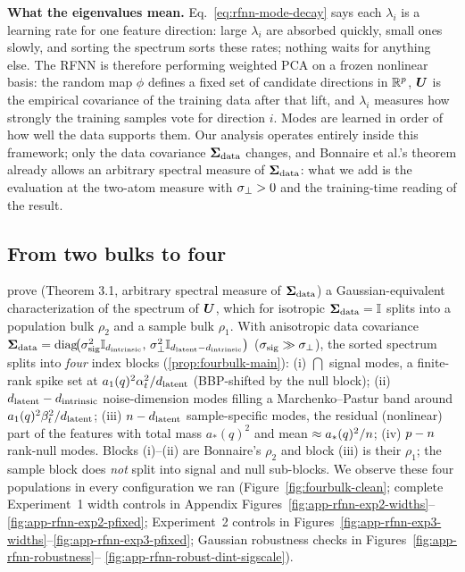 \textbf{What the eigenvalues mean.}
Eq.~\eqref{eq:rfnn-mode-decay} says each $\lambda_i$ is a learning rate for one feature direction: large $\lambda_i$ are absorbed quickly, small ones slowly, and sorting the spectrum sorts these rates; nothing waits for anything else. The RFNN is therefore performing weighted PCA on a frozen nonlinear basis: the random map $\phi$ defines a fixed set of candidate directions in $\mathbb{R}^{p}$, $\bm{U}$ is the empirical covariance of the training data after that lift, and $\lambda_i$ measures how strongly the training samples vote for direction $i$. Modes are learned in order of how well the data supports them. Our analysis operates entirely inside this framework; only the data covariance $\bm{\Sigma}_{\mathrm{data}}$ changes, and Bonnaire et al.'s theorem already allows an arbitrary spectral measure of $\bm{\Sigma}_{\mathrm{data}}$: what we add is the evaluation at the two-atom measure with $\sigma_{\perp}>0$ and the training-time reading of the result.

\subsection{From two bulks to four}
\label{sec:rfnn-fourbulks}

\citeauthor{bonnaire2025} prove (Theorem 3.1, arbitrary spectral measure of $\bm{\Sigma}_{\mathrm{data}}$) a Gaussian-equivalent characterization of the spectrum of $\bm{U}$, which for isotropic $\bm{\Sigma}_{\mathrm{data}}=\mathbb I$ splits into a population bulk $\rho_2$ and a sample bulk $\rho_1$. With anisotropic data covariance $\bm{\Sigma}_{\mathrm{data}} = \operatorname{diag}\!\bigl(\sigma_{\mathrm{sig}}^2 \mathbb{I}_{d_{\mathrm{intrinsic}}},\, \sigma_{\perp}^2 \mathbb{I}_{d_{\mathrm{latent}} - d_{\mathrm{intrinsic}}}\bigr)$ ($\sigma_{\mathrm{sig}} \gg \sigma_{\perp}$), the sorted spectrum splits into \emph{four} index blocks (\cref{prop:fourbulk-main}): (i) $\dint$ signal modes, a finite-rank spike set at $a_1(q)^2\alpha_t^2/d_{\mathrm{latent}}$ (BBP-shifted by the null block); (ii) $d_{\mathrm{latent}}-d_{\mathrm{intrinsic}}$ noise-dimension modes filling a Marchenko--Pastur band around $a_1(q)^2\beta_t^2/d_{\mathrm{latent}}$; (iii) $n-d_{\mathrm{latent}}$ sample-specific modes, the residual (nonlinear) part of the features with total mass $a_*(q)^2$ and mean $\approx a_*(q)^2/n$; (iv) $p-n$ rank-null modes. Blocks (i)--(ii) are Bonnaire's $\rho_2$ and block (iii) is their $\rho_1$; the sample block does \emph{not} split into signal and null sub-blocks. We observe these four populations in every configuration we ran (Figure~\ref{fig:fourbulk-clean}; complete Experiment~1 width controls in Appendix Figures~\ref{fig:app-rfnn-exp2-widths}--\ref{fig:app-rfnn-exp2-pfixed}; Experiment~2 controls in Figures~\ref{fig:app-rfnn-exp3-widths}--\ref{fig:app-rfnn-exp3-pfixed}; Gaussian robustness checks in Figures~\ref{fig:app-rfnn-robustness}-- \ref{fig:app-rfnn-robust-dint-sigscale}).


